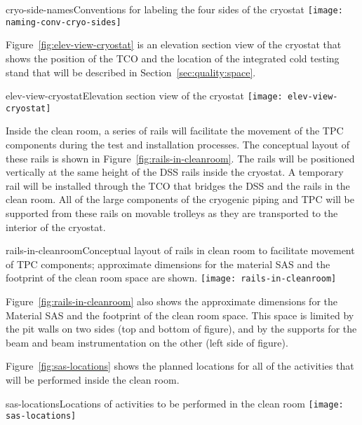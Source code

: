 \begin{cdrfigure}{cryo-side-names}{Conventions for labeling the four sides of the cryostat}
\texttt{[image: naming-conv-cryo-sides]}
\end{cdrfigure}

Figure~\ref{fig:elev-view-cryostat} is an elevation section view of the cryostat that shows the position of the TCO and the location of the integrated cold testing stand that will be described in Section~\ref{sec:quality:space}.  

\begin{cdrfigure}{elev-view-cryostat}{Elevation section view of the cryostat}
\texttt{[image: elev-view-cryostat]}
\end{cdrfigure}

Inside the clean room, a series of rails will facilitate the movement of the TPC components during the test and installation processes.  The conceptual layout of these rails is shown in Figure~\ref{fig:rails-in-cleanroom}.  The rails will be positioned vertically at the same height of the DSS rails inside the cryostat.  A temporary rail will be installed through the TCO that bridges the DSS and the rails in the clean room.  All of the large components of the cryogenic piping and TPC will be supported from these rails on movable trolleys as they are transported to the interior of the cryostat.  

\begin{cdrfigure}{rails-in-cleanroom}{Conceptual layout of rails in clean room to facilitate movement of TPC components; approximate dimensions for the material SAS and the footprint of the clean room space are shown.}
\texttt{[image: rails-in-cleanroom]}
\end{cdrfigure}


Figure~\ref{fig:rails-in-cleanroom} also shows the approximate dimensions for the Material SAS and the footprint of the clean room space.  This space is 
 limited by the pit walls on two sides (top and bottom of figure), and by the supports for the beam and beam instrumentation on the other  (left side of figure).  

Figure~\ref{fig:sas-locations} shows the planned locations for all of the activities that will be performed inside the clean room.  

\begin{cdrfigure}{sas-locations}{Locations of activities to be performed in the clean room}
\texttt{[image: sas-locations]}
\end{cdrfigure}

